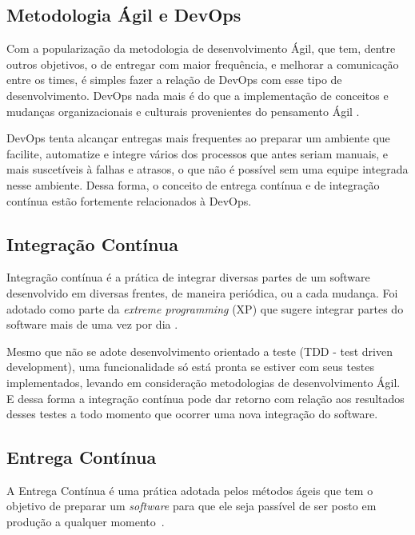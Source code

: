 \subsection{Metodologia Ágil e DevOps}

Com a popularização da metodologia de desenvolvimento Ágil, que tem, dentre outros
objetivos, o de entregar com maior frequência, e melhorar a comunicação entre os
times, é simples fazer a relação de DevOps com esse tipo de desenvolvimento.
DevOps nada mais é do que a implementação de conceitos e mudanças organizacionais
e culturais provenientes do pensamento Ágil \cite{scott2014}.

DevOps tenta alcançar entregas mais frequentes ao preparar um ambiente que facilite,
automatize e integre vários dos processos que antes seriam manuais, e mais
suscetíveis à falhas e atrasos, o que não é possível sem uma equipe integrada
nesse ambiente. Dessa forma, o conceito de entrega contínua e de integração
contínua estão fortemente relacionados à DevOps.~\cite{adambertram:2016}


\subsection{Integração Contínua}

Integração contínua é a prática de integrar diversas partes de um software
desenvolvido em diversas frentes, de maneira periódica, ou a cada mudança.
Foi adotado como parte da \textit{extreme programming} (XP) que sugere integrar
partes do software mais de uma vez por dia \cite{fowler2006continuous}.

Mesmo que não se adote desenvolvimento orientado a teste (TDD - test driven 
development), uma funcionalidade só está pronta se estiver com seus testes 
implementados, levando em consideração metodologias de desenvolvimento Ágil. 
E dessa forma a integração contínua pode dar retorno com relação aos resultados
desses testes a todo momento que ocorrer uma nova integração do software.

\subsection{Entrega Contínua}

A Entrega Contínua é uma prática adotada pelos métodos ágeis que tem o objetivo
de preparar um \textit{software} para que ele seja passível de ser posto em produção a
qualquer momento~\cite{olausson:2016}. %

